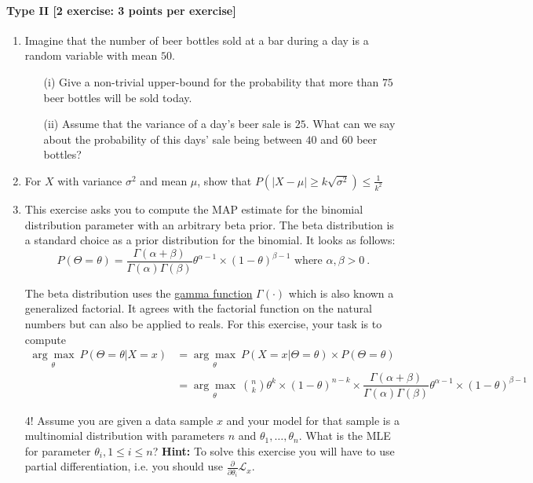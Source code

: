 \documentclass{article}
\begin{document}
\paragraph{Type II [2 exercise: 3 points per exercise]}
\begin{enumerate}
	\item Imagine that the number of beer bottles sold at a bar during a day is a random variable with mean $50$.
		\begin{itemize}
			\item[(i)] Give a non-trivial upper-bound for the probability that more than $75$ beer bottles will be sold today.
			\item[(ii)] Assume that the variance of a day's beer sale is $25$. What can we say about the probability of this days' sale being between $40$ and $60$ beer bottles?
		\end{itemize}
	
	\item For $X$ with variance $\sigma^2$ and mean $\mu$, show that $P(|X-\mu| \geq k\sqrt{\sigma^2}) \leq \frac{1}{k^2}$
	
	\item This exercise asks you to compute the MAP estimate for the binomial distribution parameter with an arbitrary beta prior. The beta distribution
	is a standard choice as a prior distribution for the binomial. It looks as follows:
	\begin{equation*}
	P(\Theta=\theta) = \dfrac{\Gamma(\alpha + \beta)}{\Gamma(\alpha)\Gamma(\beta)}\theta^{\alpha-1} \times (1-\theta)^{\beta-1} \mbox{ where } \alpha, \beta > 0 \ .
	\end{equation*}
	
	The beta distribution uses the \href{https://en.wikipedia.org/wiki/Gamma_function}{gamma function} $ \Gamma(\cdot) $ which is also known a generalized factorial.
	It agrees with the factorial function on the natural numbers but can also be applied to reals.	
	For this exercise, your task is to compute
	\begin{align*}
	\underset{\theta}{\arg\max}~P(\Theta=\theta|X=x) &= \underset{\theta}{\arg\max}~P(X =x |\Theta = \theta) \times P(\Theta = \theta) \\
	&= \underset{\theta}{\arg\max}~\binom{n}{k}\theta^{k}\times (1-\theta)^{n-k} \times \dfrac{\Gamma(\alpha + \beta)}{\Gamma(\alpha)\Gamma(\beta)}\theta^{\alpha-1} \times (1-\theta)^{\beta-1}
	\end{align*}

\item[4!] Assume you are given a data sample $ x $ and your model for that sample is a multinomial distribution with parameters $ n $ and 
	$ \theta_{1}, \ldots, \theta_{n} $. What is the MLE for parameter $ \theta_{i}, 1 \leq i \leq n $? \textbf{Hint:} To solve this exercise you will
	have to use partial differentiation, i.e. you should use $ \frac{\partial}{\partial\theta_{i}}\mathcal{L}_{x} $.
\end{enumerate}
\end{document}
